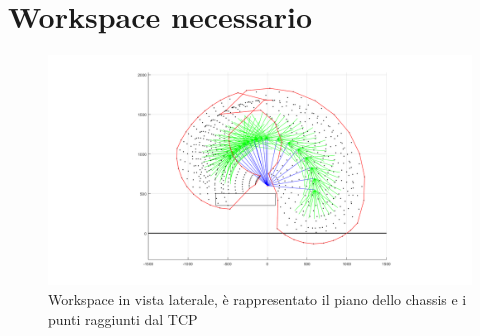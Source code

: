 \documentclass[%
corpo=11pt,
twoside,
 stile=classica,
oldstyle,
greek,%
]{toptesi}
\begin{document}
\section{Workspace necessario}



\begin{figure} [H]
	\centering
	\includegraphics[width=1\textwidth]{Plots/workspace.png}
	\caption{Workspace in vista laterale, è rappresentato il piano dello chassis e i punti raggiunti dal TCP}
	\label{fig:workspace}
\end{figure}
\end{document}
